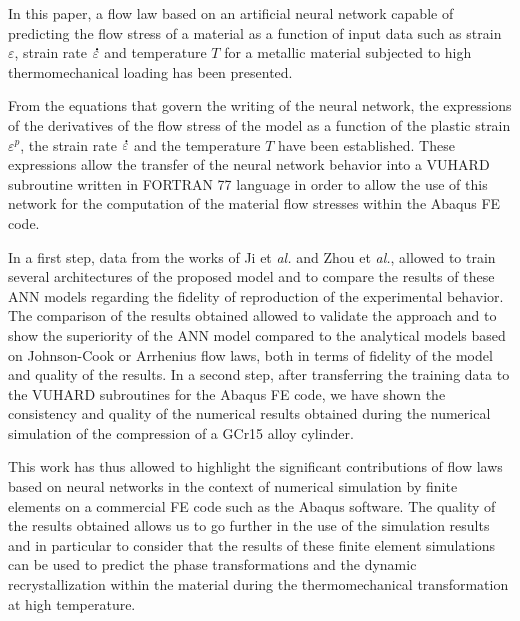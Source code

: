 \documentclass[algorithms,article,submit,pdftex,moreauthors]{Definitions/mdpi}
\makeatletter
\DeclareRobustCommand{\mdot}[1]{\accentset{\mbox{\bfseries .}}{#1}}
\DeclareRobustCommand{\eal}{et \emph{al.}\@\xspace}
\makeatother
\begin{document}
In this paper, a flow law based on an artificial neural network capable of predicting the flow stress of a material as a function of input data such as strain $\varepsilon$, strain rate $\mdot\varepsilon$ and temperature $T$ for a metallic material subjected to high thermomechanical loading has been presented.

From the equations that govern the writing of the neural network, the expressions of the derivatives of the flow stress of the model as a function of the plastic strain $\varepsilon^p$, the strain rate $\mdot\varepsilon$ and the temperature $T$ have been established.
These expressions allow the transfer of the neural network behavior into a VUHARD subroutine written in FORTRAN 77 language in order to allow the use of this network for the computation of the material flow stresses within the Abaqus FE code.

In a first step, data from the works of Ji \eal \cite{Ji-2018} and Zhou \eal \cite{Zhou-2020}, allowed to train several architectures of the proposed model and to compare the results of these ANN models regarding the fidelity of reproduction of the experimental behavior.
The comparison of the results obtained allowed to validate the approach and to show the superiority of the ANN model compared to the analytical models based on Johnson-Cook or Arrhenius flow laws, both in terms of fidelity of the model and quality of the results.
In a second step, after transferring the training data to the VUHARD subroutines for the Abaqus FE code, we have shown the consistency and quality of the numerical results obtained during the numerical simulation of the compression of a GCr15 alloy cylinder.

This work has thus allowed to highlight the significant contributions of flow laws based on neural networks in the context of numerical simulation by finite elements on a commercial FE code such as the Abaqus software.
The quality of the results obtained allows us to go further in the use of the simulation results and in particular to consider that the results of these finite element simulations can be used to predict the phase transformations and the dynamic recrystallization within the material during the thermomechanical transformation at high temperature.

\vspace{6pt}

\end{document}
